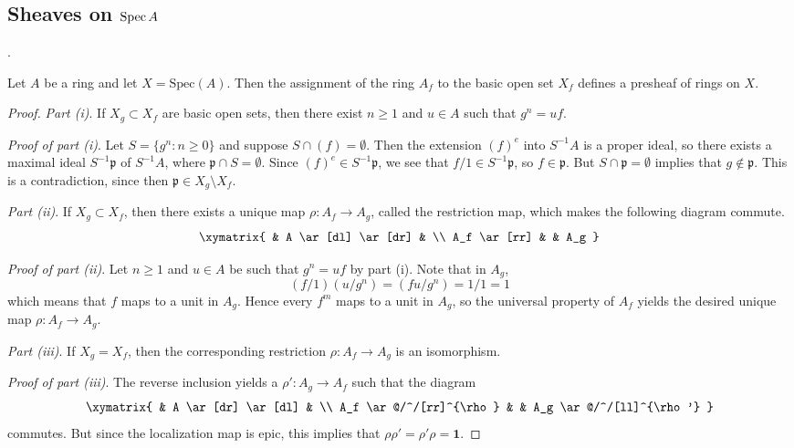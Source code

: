 \subsection{Sheaves on $\operatorname{Spec} A$}

.

\begin{proposition}
Let $ A$ be a ring and let $ X = \mathrm{Spec}(A)$. Then the
assignment of the ring $A_f$ to the basic open set $X_f$ defines
a presheaf of rings on $X$.
\end{proposition}

\begin{proof} \mbox{}

\emph{Part (i)}. If $ X_g \subset X_f$ are basic open sets,
then there exist $ n \geq 1$ and $ u \in A$ such that $ g^n =
uf$.

\emph{Proof of part (i)}. Let $ S = \{g^n : n \geq 0\}$ and
suppose $ S \cap (f) = \emptyset$. Then the extension $ (f)^e$
into $ S^{-1}A$ is a proper ideal, so there exists a maximal
ideal $ S^{-1}\mathfrak{p}$ of $ S^{-1}A$, where $ \mathfrak{p}
\cap S = \emptyset$. Since $ (f)^e \in S^{-1}\mathfrak{p}$, we
see that $ f/1 \in S^{-1}\mathfrak{p}$, so $ f \in
\mathfrak{p}$. But $ S \cap \mathfrak{p} = \emptyset$ implies
that $ g \notin \mathfrak{p}$. This is a contradiction, since
then $ \mathfrak{p} \in X_g \setminus X_f$.

\emph{Part (ii)}. If $ X_g \subset X_f$, then there exists a
unique map $ \rho : A_f \to A_g$, called the restriction map,
which makes the following diagram commute.
\[ \xymatrix{ & A \ar[dl] \ar[dr] & \\ A_f \ar[rr] & & A_g } \]

\emph{Proof of part (ii)}. 
Let $ n \geq 1$ and $ u \in A$ be such that $ g^n = uf$ by part
(i). Note that in $ A_g$,
\[ (f/1)(u/g^n) = (fu/g^n) = 1/1 = 1 \]
which means that $ f$ maps to a unit in $ A_g$. Hence every $
f^m$ maps to a unit in $ A_g$, so the universal property of $
A_f$ yields the desired unique map $ \rho : A_f \to A_g$.

\emph{Part (iii)}. 
If $ X_g = X_f$, then the corresponding restriction $ \rho : A_f
\to A_g$ is an isomorphism.

\emph{Proof of part (iii)}. 
The reverse inclusion yields a $ \rho' : A_g \to A_f$ such that
the diagram
\[ \xymatrix{
& A \ar[dr] \ar[dl] & \\
A_f \ar@/^/[rr]^{\rho} & & A_g \ar@/^/[ll]^{\rho'}
} \]
commutes. But since the localization map is epic, this implies
that $ \rho \rho' = \rho' \rho = \mathbf{1}$.


\end{proof}
